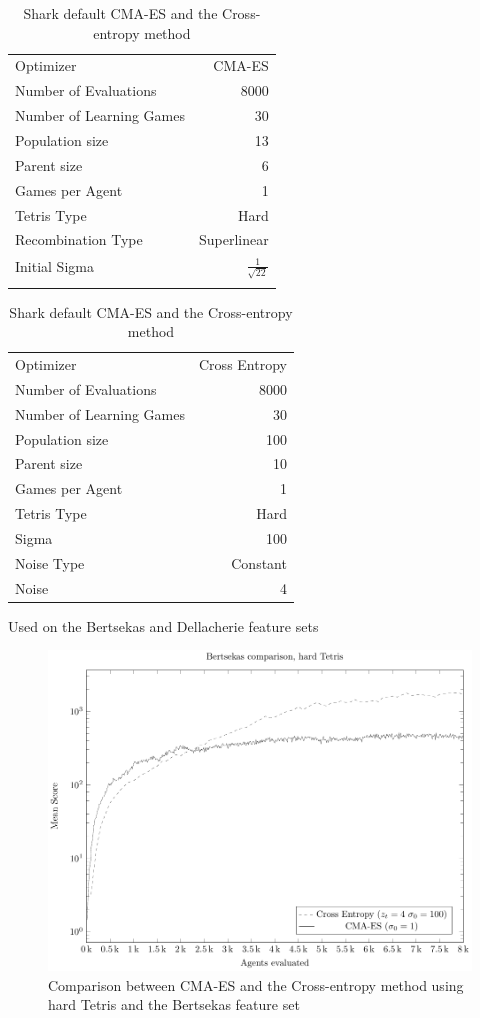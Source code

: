 \begin{table}[h]
\centering
\small
\begin{tabular}{l r}
Optimizer & CMA-ES\\
Number of Evaluations & 8000\\
Number of Learning Games & 30\\
Population size& 13\\
Parent size & 6\\
Games per Agent & 1\\
Tetris Type & Hard\\
\hline
Recombination Type & Superlinear\\
Initial Sigma & $\frac{1}{\sqrt{22}}$\\
\quad & \quad
\end{tabular}
\quad
\begin{tabular}{l r}
Optimizer & Cross Entropy\\
Number of Evaluations & 8000\\
Number of Learning Games & 30\\
Population size & 100\\
Parent size & 10\\
Games per Agent & 1\\
Tetris Type & Hard\\
\hline
Sigma & 100\\
Noise Type & Constant\\
Noise & 4
\end{tabular}
\caption{Shark default CMA-ES and the Cross-entropy method}
\end{table}


Used on the Bertsekas and Dellacherie feature sets

\begin{figure}[H]
\includegraphics[scale=1]{plots/plotBertsekasCmaVsCEHardTetris}
\caption{Comparison between CMA-ES and the Cross-entropy method
using hard Tetris and the Bertsekas feature set}
\end{figure}

